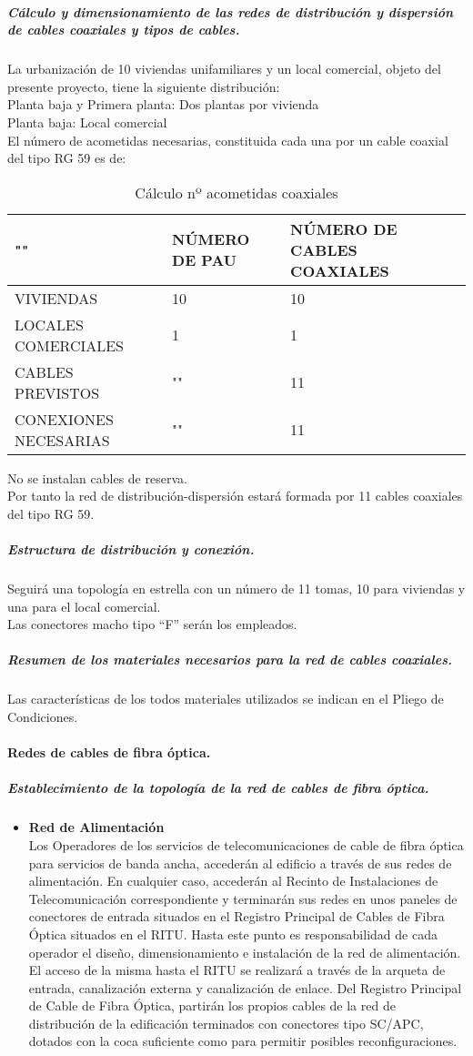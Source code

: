 \subparagraph{Cálculo y dimensionamiento de las redes de distribución y dispersión de cables coaxiales y tipos de cables.}
La urbanización de 10 viviendas unifamiliares y un local comercial, objeto del presente proyecto, tiene la siguiente distribución:\\
Planta baja y Primera planta:			Dos plantas por vivienda\\
Planta baja:							Local comercial\\
El número de acometidas necesarias, constituida cada una por un cable coaxial del tipo RG 59 es de:
\begin{table}[H]
\centering
\begin{tabular}{|p{5cm} |p{5cm} |p{5cm}|}
\hline
""&NÚMERO DE PAU&NÚMERO DE CABLES COAXIALES \\
\hline \hline
VIVIENDAS&10&10\\
\hline
LOCALES COMERCIALES&1&1\\
\hline
CABLES PREVISTOS&""&11\\
\hline
CONEXIONES NECESARIAS&""&11\\
\hline
\end{tabular}
\caption{Cálculo nº acometidas coaxiales}
\label{tabla:autores}
\end{table}
No se instalan cables de reserva.\\
Por tanto la red de distribución-dispersión estará formada por 11 cables coaxiales del tipo RG 59.
\subparagraph{Estructura de distribución y conexión.}
Seguirá una topología en estrella con un número de 11 tomas, 10 para viviendas y una para el local comercial.\\
Las conectores macho tipo “F” serán los empleados.
\subparagraph{Resumen de los materiales necesarios para la red de cables coaxiales.}
Las características de los todos materiales utilizados se indican en el Pliego de Condiciones.
\paragraph{Redes de cables de fibra óptica.}
\subparagraph{Establecimiento de la topología de la red de cables de fibra óptica.}
\begin{itemize}
	\item \textbf{Red de Alimentación}\\
	Los Operadores de los servicios de telecomunicaciones de cable de fibra óptica para servicios de
banda ancha, accederán al edificio a través de sus redes de alimentación. En cualquier caso,
accederán al Recinto de Instalaciones de Telecomunicación correspondiente y terminarán sus
redes en unos paneles de conectores de entrada situados en el Registro Principal de Cables de
Fibra Óptica situados en el RITU.
Hasta este punto es responsabilidad de cada operador el diseño, dimensionamiento e instalación
de la red de alimentación. El acceso de la misma hasta el RITU se realizará a través de la arqueta
de entrada, canalización externa y canalización de enlace.
Del Registro Principal de Cable de Fibra Óptica, partirán los propios cables de la red de
distribución de la edificación terminados con conectores tipo SC/APC, dotados con la coca
suficiente como para permitir posibles reconfiguraciones.
\end{itemize}

